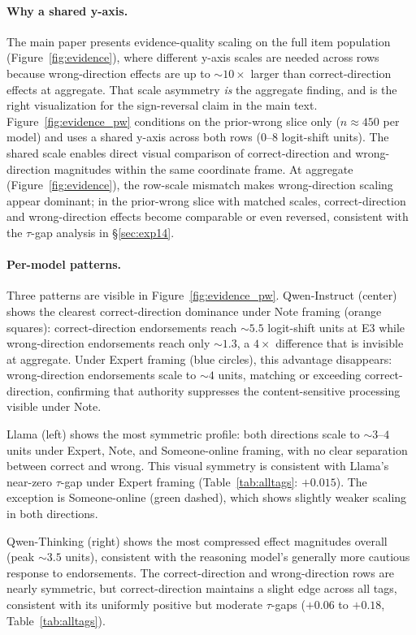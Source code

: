 \documentclass[11pt]{article}
\begin{document}
\paragraph{Why a shared y-axis.}
The main paper presents evidence-quality scaling on the full item population (Figure~\ref{fig:evidence}), where different y-axis scales are needed across rows because wrong-direction effects are up to ${\sim}10\times$ larger than correct-direction effects at aggregate.
That scale asymmetry \emph{is} the aggregate finding, and is the right visualization for the sign-reversal claim in the main text.
Figure~\ref{fig:evidence_pw} conditions on the prior-wrong slice only ($n \approx 450$ per model) and uses a shared y-axis across both rows (0--8 logit-shift units).
The shared scale enables direct visual comparison of correct-direction and wrong-direction magnitudes within the same coordinate frame.
At aggregate (Figure~\ref{fig:evidence}), the row-scale mismatch makes wrong-direction scaling appear dominant; in the prior-wrong slice with matched scales, correct-direction and wrong-direction effects become comparable or even reversed, consistent with the $\tau$-gap analysis in \S\ref{sec:exp14}.

\paragraph{Per-model patterns.}
Three patterns are visible in Figure~\ref{fig:evidence_pw}.
Qwen-Instruct (center) shows the clearest correct-direction dominance under Note framing (orange squares): correct-direction endorsements reach ${\sim}5.5$ logit-shift units at E3 while wrong-direction endorsements reach only ${\sim}1.3$, a $4\times$ difference that is invisible at aggregate.
Under Expert framing (blue circles), this advantage disappears: wrong-direction endorsements scale to ${\sim}4$ units, matching or exceeding correct-direction, confirming that authority suppresses the content-sensitive processing visible under Note.

Llama (left) shows the most symmetric profile: both directions scale to ${\sim}3$--$4$ units under Expert, Note, and Someone-online framing, with no clear separation between correct and wrong.
This visual symmetry is consistent with Llama's near-zero $\tau$-gap under Expert framing (Table~\ref{tab:alltags}: $+0.015$).
The exception is Someone-online (green dashed), which shows slightly weaker scaling in both directions.

Qwen-Thinking (right) shows the most compressed effect magnitudes overall (peak ${\sim}3.5$ units), consistent with the reasoning model's generally more cautious response to endorsements.
The correct-direction and wrong-direction rows are nearly symmetric, but correct-direction maintains a slight edge across all tags, consistent with its uniformly positive but moderate $\tau$-gaps ($+0.06$ to $+0.18$, Table~\ref{tab:alltags}).
\end{document}
